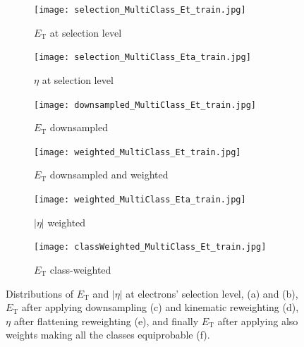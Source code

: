 \begin{figure}[htbp]
  \centering
  \begin{subfigure}[b]{0.48\textwidth}
      \centering
      \texttt{[image: selection\_MultiClass\_Et\_train.jpg]}
      \caption{$E_{\text{T}}$ at selection level}
      \label{fig:et_selection}
  \end{subfigure}
  \hfill
  \begin{subfigure}[b]{0.48\textwidth}
      \centering
      \texttt{[image: selection\_MultiClass\_Eta\_train.jpg]}
      \caption{$\eta$ at selection level}
      \label{fig:eta_selection}
  \end{subfigure}
  \vspace{0.4cm}
  \begin{subfigure}[b]{0.48\textwidth}
      \centering
      \texttt{[image: downsampled\_MultiClass\_Et\_train.jpg]}
      \caption{$E_{\text{T}}$ downsampled}
      \label{fig:et_downsampling}
  \end{subfigure}
  \hfill
  \begin{subfigure}[b]{0.48\textwidth}
      \centering
      \texttt{[image: weighted\_MultiClass\_Et\_train.jpg]}
      \caption{$E_{\text{T}}$ downsampled and weighted}
      \label{fig:et_reweighted}
  \end{subfigure}
  \vspace{0.4cm}
  \begin{subfigure}[b]{0.48\textwidth}
      \centering
      \texttt{[image: weighted\_MultiClass\_Eta\_train.jpg]}
      \caption{$|\eta|$ weighted}
      \label{fig:eta_reweighted}
  \end{subfigure}
  \hfill
  \begin{subfigure}[b]{0.48\textwidth}
      \centering
      \texttt{[image: classWeighted\_MultiClass\_Et\_train.jpg]}
      \caption{$E_{\text{T}}$ class-weighted }
      \label{fig:et_classWeighted}
  \end{subfigure}
  \caption{Distributions of $E_{\text{T}}$ and $|\eta|$ at electrons' selection level, (a) and (b), $E_{\text{T}}$ after applying downsampling (c) and kinematic reweighting (d), $\eta$ after flattening reweighting (e), and finally $E_{\text{T}}$ after applying also weights making all the classes equiprobable (f).}
  \label{fig:et_eta_reweighting}
\end{figure}


